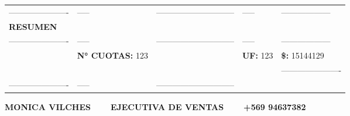 \documentclass[10pt]{article}
\begin{document}
\begin{tabular}{lllll}
\hline
\color{white}----------------------& \color{white}----- & \color{white}----------------------------- & \color{white}-----  & \color{white}------------------ \\
\textbf{\Large RESUMEN} & & & &\\ 
\color{white}----------------------& \color{white}----- & \color{white}----------------------------- & \color{white}-----  & \color{white}------------------ \\
 & \textbf{N° CUOTAS: }123& &\textbf{UF: } 123 & \textbf{\$: } 15144129 \\  
 & & & &\color{white}---------------------- \\
 \color{white}----------------------& \color{white}----- & \color{white}----------------------------- &\\

 \hline
 \end{tabular}
 \begin{center}
     \textbf{MONICA VILCHES  $\color{white}--$  EJECUTIVA DE VENTAS $\color{white}--$   +569 94637382}
 \end{center}
 
\end{document}
